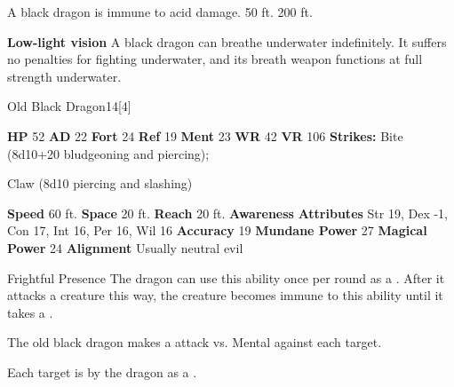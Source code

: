       
       A black dragon is immune to acid damage.
     50 ft.
     200 ft.
    \par\noindent\textbf{Low-light vision}
        A black dragon can breathe underwater indefinitely.
        It suffers no penalties for fighting underwater, and its breath weapon functions at full strength underwater.
  

  \begin{monsubsection}{Old Black Dragon}{14}[4]
    \vspace{-1em}\vspace{-1em}
    \vspace{0em}

    
    

    \begin{spellcontent}
      \begin{spelltargetinginfo}
        \pari \textbf{HP} 52 \monsep
          \textbf{AD} 22 \monsep
          \textbf{Fort} 24 \monsep
          \textbf{Ref} 19 \monsep
          \textbf{Ment} 23
        \pari \textbf{WR} 42 \monsep
        \textbf{VR} 106
        \pari \textbf{Strikes:}
            Bite  (8d10+20 bludgeoning and piercing);
\par Claw  (8d10 piercing and slashing)
      \end{spelltargetinginfo}
    \end{spellcontent}
    \begin{monsterfooter}
      \pari \textbf{Speed} 60 ft. \monsep
        \textbf{Space} 20 ft. \monsep
        \textbf{Reach} 20 ft.
      \pari \textbf{Awareness} 
      \pari \textbf{Attributes}
        Str 19, Dex -1,
        Con 17, Int 16,
        Per 16, Wil 16
      \pari \textbf{Accuracy} 19 \monsep
        \textbf{Mundane Power} 27 \monsep
      \textbf{Magical Power} 24
      \pari \textbf{Alignment} Usually neutral evil
    \end{monsterfooter}
  \end{monsubsection}
  \begin{freeability}{Frightful Presence}
      The dragon can use this ability once per round as a .
      After it attacks a creature this way, the creature becomes immune to this ability until it takes a .
      \par The old black dragon makes a  attack
        vs. Mental against each target.
    
    \hit Each target is  by the dragon as a .
    \end{freeability}
  

